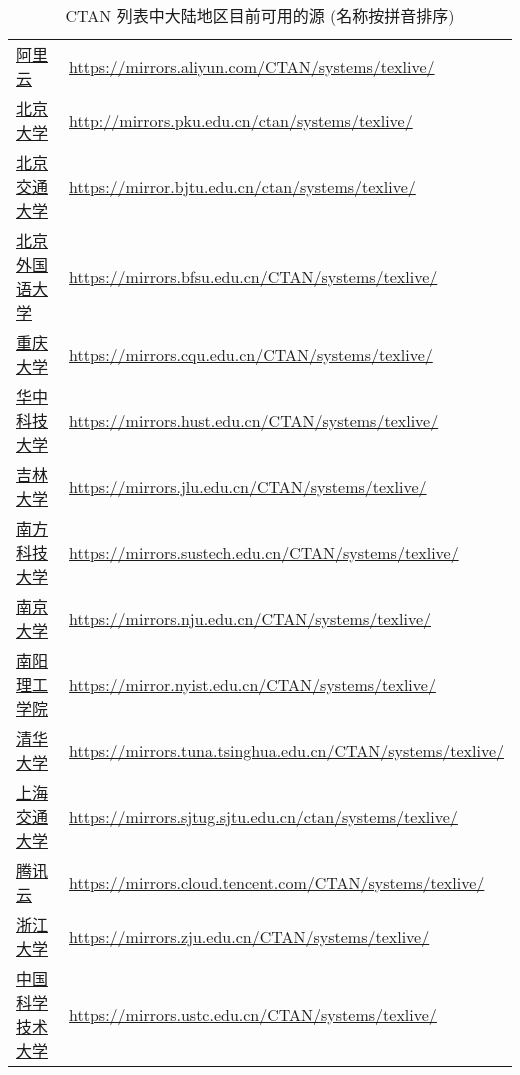 \begin{table}
  \centering
  \caption{CTAN 列表中大陆地区目前可用的源 (名称按拼音排序)}\label{tab:appendix:mirror}
  \begin{tabular}{*{2}{l}}
    \hline\hline
    \href{https://developer.aliyun.com/mirror/}{阿里云}
    & \url{https://mirrors.aliyun.com/CTAN/systems/texlive/}\\
    \href{http://mirrors.pku.edu.cn/}{北京大学}
    & \url{http://mirrors.pku.edu.cn/ctan/systems/texlive/}\\
    \href{https://mirror.bjtu.edu.cn/}{北京交通大学}
    & \url{https://mirror.bjtu.edu.cn/ctan/systems/texlive/}\\
    \href{https://mirrors.bfsu.edu.cn/}{北京外国语大学}
    & \url{https://mirrors.bfsu.edu.cn/CTAN/systems/texlive/}\\
    \href{https://mirrors.cqu.edu.cn/}{重庆大学}
    & \url{https://mirrors.cqu.edu.cn/CTAN/systems/texlive/}\\
    \href{https://mirrors.hust.edu.cn/}{华中科技大学}
    & \url{https://mirrors.hust.edu.cn/CTAN/systems/texlive/}\\
    \href{https://mirrors.jlu.edu.cn/}{吉林大学}
    & \url{https://mirrors.jlu.edu.cn/CTAN/systems/texlive/}\\
    \href{https://mirrors.sustech.edu.cn/}{南方科技大学}
    & \url{https://mirrors.sustech.edu.cn/CTAN/systems/texlive/}\\
    \href{https://mirrors.nju.edu.cn/}{南京大学}
    & \url{https://mirrors.nju.edu.cn/CTAN/systems/texlive/}\\
    \href{https://mirror.nyist.edu.cn/}{南阳理工学院}
    & \url{https://mirror.nyist.edu.cn/CTAN/systems/texlive/}\\
    \href{https://mirrors.tuna.tsinghua.edu.cn/}{清华大学}
    & \url{https://mirrors.tuna.tsinghua.edu.cn/CTAN/systems/texlive/}\\
    \href{https://mirrors.sjtug.sjtu.edu.cn/}{上海交通大学}
    & \url{https://mirrors.sjtug.sjtu.edu.cn/ctan/systems/texlive/}\\
    \href{https://mirrors.cloud.tencent.com/}{腾讯云}
    & \url{https://mirrors.cloud.tencent.com/CTAN/systems/texlive/}\\
    \href{https://mirrors.zju.edu.cn/}{浙江大学}
    & \url{https://mirrors.zju.edu.cn/CTAN/systems/texlive/}\\
    \href{https://mirrors.ustc.edu.cn/}{中国科学技术大学}
    & \url{https://mirrors.ustc.edu.cn/CTAN/systems/texlive/}\\
    \hline\hline
  \end{tabular}
\end{table}


